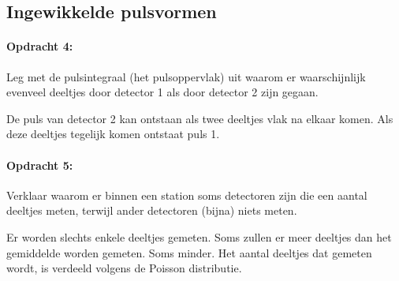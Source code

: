 \subsection{Ingewikkelde pulsvormen}

\begin{minipage}[t]{1\columnwidth}%

\paragraph{Opdracht 4:}

Leg met de pulsintegraal (het pulsoppervlak) uit waarom er
waarschijnlijk evenveel deeltjes door detector 1 als door detector
2 zijn gegaan.

De puls van detector 2 kan ontstaan als twee deeltjes vlak na elkaar
komen. Als deze deeltjes tegelijk komen ontstaat puls 1.

\end{minipage}

\begin{minipage}[t]{1\columnwidth}%

\paragraph{Opdracht 5:}

Verklaar waarom er binnen een station soms detectoren zijn
die een aantal deeltjes meten, terwijl ander detectoren (bijna) niets
meten.

Er worden slechts enkele deeltjes gemeten. Soms zullen er meer deeltjes
dan het gemiddelde worden gemeten. Soms minder. Het aantal deeltjes
dat gemeten wordt, is verdeeld volgens de Poisson distributie.

\end{minipage}

